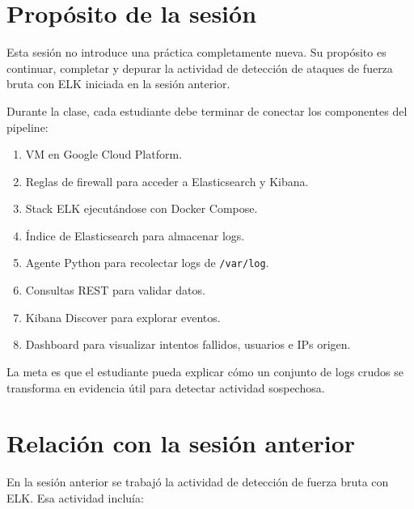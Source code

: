 \documentclass[
  coursetitle={Cómputo Nube y Tecnologías Emergentes},
  coursehours={96},
  coursedate={Verano 2026},
  doctype={Práctica},
  otherlangs={english,french},
  authorname={Lázaro},
  authorsurname={Bustio-Martínez},
  authortitle={PhD},
  role={Profesor Investigador},
  email={lbustio@inaoe.mx},
  phone={5559504000},
  ext={7459},
  institution={Instituto Nacional de Astrofísica, Óptica y Electrónica (INAOE)},
  department={Maestría en Ciencias en Tecnologías de Seguridad},
  address={Luis Enrique Erro 1, Sta. Ma. Tonantzintla, San Andrés Cholula, CP 72840, Puebla, México},
  margin={0.5in}
]{../../lbustio_lecture_notes}
\begin{document}
\IberoCover


\section{Propósito de la sesión}

Esta sesión no introduce una práctica completamente nueva. Su propósito es continuar, completar y depurar la actividad de detección de ataques de fuerza bruta con ELK iniciada en la sesión anterior.

Durante la clase, cada estudiante debe terminar de conectar los componentes del pipeline:

\begin{enumerate}
    \item VM en Google Cloud Platform.
    \item Reglas de firewall para acceder a Elasticsearch y Kibana.
    \item Stack ELK ejecutándose con Docker Compose.
    \item Índice de Elasticsearch para almacenar logs.
    \item Agente Python para recolectar logs de \texttt{/var/log}.
    \item Consultas REST para validar datos.
    \item Kibana Discover para explorar eventos.
    \item Dashboard para visualizar intentos fallidos, usuarios e IPs origen.
\end{enumerate}

La meta es que el estudiante pueda explicar cómo un conjunto de logs crudos se transforma en evidencia útil para detectar actividad sospechosa.

\section{Relación con la sesión anterior}

En la sesión anterior se trabajó la actividad de detección de fuerza bruta con ELK. Esa actividad incluía:
\end{document}
